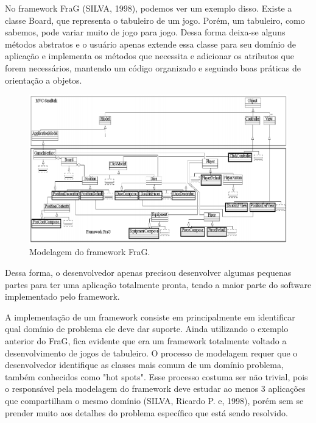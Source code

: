 \documentclass[
    12pt,       %
    openright,      %
    twoside,      %
    a4paper,      %
    english,      %
    french,       %
    spanish,      %
    brazil,       %
    ]{abntex2}
\begin{document}
          No framework FraG (SILVA, 1998), podemos ver um exemplo disso. Existe
          a classe Board, que representa o tabuleiro de um jogo. Porém, um
          tabuleiro, como sabemos, pode variar muito de jogo para jogo. Dessa
          forma deixa-se alguns métodos abstratos e o usuário apenas extende
          essa classe para seu domínio de aplicação e implementa os métodos que
          necessita e adicionar os atributos que forem necessários, mantendo
          um código organizado e seguindo boas práticas de orientação a objetos.

          \begin{figure}[htbp]
              \begin{center}
                  \includegraphics[width=1.0\textwidth]{img/frag.png}
              \end{center}
              \caption{\label{fig:passaro}Modelagem do framework FraG.}
          \end{figure}

          Dessa forma, o desenvolvedor apenas precisou desenvolver algumas pequenas
          partes para ter uma aplicação totalmente pronta, tendo a maior parte
          do software implementado pelo framework.

          A implementação de um framework consiste em principalmente em identificar
          qual domínio de problema ele deve dar suporte. Ainda utilizando o exemplo
          anterior do FraG, fica evidente que era um framework totalmente voltado a
          desenvolvimento de jogos de tabuleiro. O processo de modelagem
          requer que o desenvolvedor identifique as classes mais comum de um domínio
          problema, também conhecidos como "hot spots". Esse processo costuma ser
          não trivial, pois o responsável pela modelagem do framework deve estudar
          ao menos 3 aplicações que compartilham o mesmo domínio (SILVA, Ricardo P. e, 1998), porém sem se prender muito aos detalhes do problema específico que
          está sendo resolvido.
\end{document}

